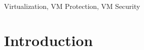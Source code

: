 \documentclass[conference]{IEEEtran}
\begin{document}
\begin{abstract}

\end{abstract}

\begin{IEEEkeywords}
Virtualization, VM Protection, VM Security
\end{IEEEkeywords}

\section{Introduction}
\end{document}
